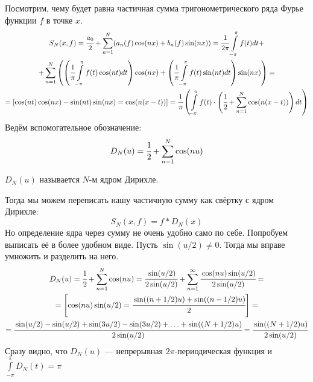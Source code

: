\documentclass[a4paper, 12pt]{article}
\begin{document}
Посмотрим, чему будет равна частичная сумма тригонометрического ряда Фурье функции $f$ в точке $x$.
\begin{gather}
	S_N(x,f) = \cfrac{a_0}{2} + \sum\limits_{n=1}^{N}(a_n(f) \cos(nx) + b_n(f) \sin(nx)) = \cfrac{1}{2\pi}\int\limits_{-\pi}^{\pi} f(t)dt +\\
	+\sum\limits_{n=1}^{N}\left(\left( \cfrac{1}{\pi}\int\limits_{-\pi}^{\pi}f(t)\cos(nt) dt\right)\cos(nx) +
	\left( \cfrac{1}{\pi}\int\limits_{-\pi}^{\pi}f(t)\sin(nt) dt\right)\sin(nx) \right) = \\
	= [\cos(nt)\cos(nx) - \sin(nt)\sin(nx) = \cos(n(x-t))] 
	=\cfrac{1}{\pi}\left( \int\limits_{-\pi}^{\pi}f(t) \cdot \left( \cfrac{1}{2} + \sum \limits_{n=1}^{N}\cos(n(x-t))\right)dt\right)
\end{gather}
Ведём вспомогательное обозначение:
$$
	D_N(u) = \cfrac{1}{2} + \sum\limits_{n=1}^{N}\cos(nu)
$$
\begin{Def}
	$D_N(u)$ называется $N$-м ядром Дирихле. 
\end{Def}
Тогда мы можем переписать нашу частичную сумму как свёртку с ядром Дирихле:
$$
	S_N(x, f) = f*D_N(x)
$$
Но определение ядра через сумму не очень удобно само по себе. Попробуем выписать её в более удобном виде. Пусть $\sin(u/2) \neq 0$. Тогда мы вправе умножить и разделить на него.
\begin{gather}
	D_N(u) = \cfrac{1}{2} + \sum\limits_{n=1}^{N}\cos(nu) = \cfrac{\sin(u/2)}{2\sin(u/2)} + \sum\limits_{n=1}^{\infty} \cfrac{\cos(nu)\sin(u/2)}{2\sin(u/2)} =\\
	= \left[\cos(nu)\sin(u/2) = \cfrac{\sin((n + 1/2)u) + \sin((n-1/2)u)}{2}\right]=\\
	= \cfrac{\sin(u/2) - \sin(u/2) + \sin(3u/2) - \sin(3u/2) + \ldots + \sin((N + 1/2)u)}{2\sin(u/2)} = \cfrac{\sin((N + 1/2)u)}{2\sin(u/2)}
\end{gather}
Сразу видно, что $D_N(u)$ --- непрерывная $2\pi$-периодическая функция и $\int\limits_{-\pi}^{\pi}D_N(t) = \pi$
\end{document}
